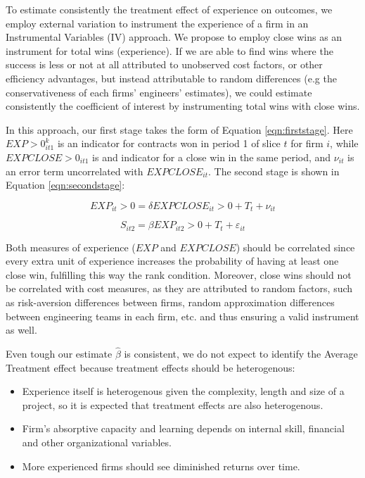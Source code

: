 To estimate consistently the treatment effect of experience on outcomes, we employ external variation to instrument the experience of a firm in an Instrumental Variables (IV) approach. We propose to employ close wins as an instrument for total wins (experience). If we are able to find wins where the success is less or not at all attributed to unobserved cost factors, or other efficiency advantages, but instead attributable to random differences (e.g the conservativeness of each firms' engineers' estimates), we could estimate consistently the coefficient of interest by instrumenting total wins with close wins.

In this approach, our first stage takes the form of Equation \ref{eqn:firststage}. Here $EXP>0_{it1}^k$ is an indicator for contracts won in period 1 of slice $t$ for firm $i$, while $EXPCLOSE>0_{it1}$ is and indicator for a close win in the same period, and $\nu_{it}$ is an error term uncorrelated with $EXPCLOSE_{it}$. The second stage is shown in Equation \ref{eqn:secondstage}:

\begin{equation}
\label{eqn:firststage}
EXP_{it}>0= \delta EXPCLOSE_{it}>0+T_t+\nu_{it}
\end{equation}

\begin{equation}
\label{eqn:secondstage}
S_{it2}= \beta EXP_{it2}>0+T_t+\varepsilon_{it}
\end{equation}

Both measures of experience ($EXP$ and $EXPCLOSE$) should be correlated since every extra unit of experience increases the probability of having at least one close win, fulfilling this way the rank condition. Moreover, close wins should not be correlated with cost measures, as they are attributed to random factors, such as risk-aversion differences between firms, random approximation differences between engineering teams in each firm, etc. and thus ensuring a valid instrument as well.

Even tough our estimate $\hat{\beta}$ is consistent,
we do not expect to identify the Average Treatment effect because treatment effects should be heterogenous:
\begin{itemize}[itemsep=1pt]
  \item Experience itself is heterogenous given the complexity, length and size of a project, so it is expected that treatment effects are also heterogenous.
  \item Firm's absorptive capacity and learning depends on internal skill, financial and other organizational variables.
  \item More experienced firms should see diminished returns over time.
  \end{itemize}

